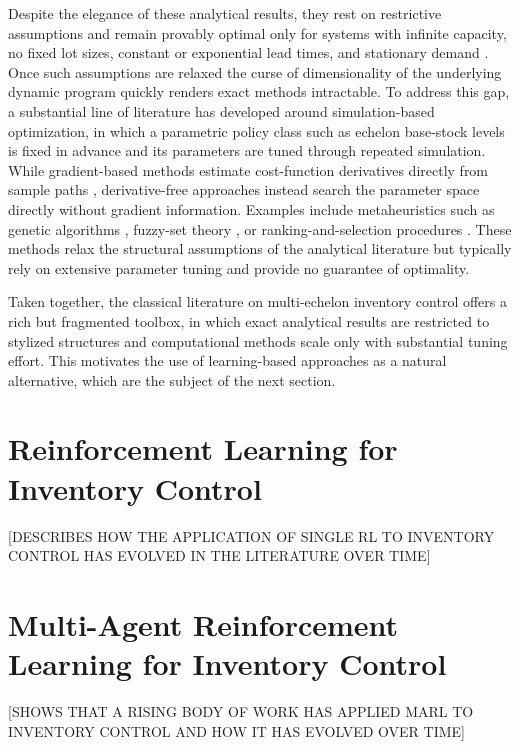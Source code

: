 Despite the elegance of these analytical results, they rest on restrictive assumptions and remain provably optimal only for systems with infinite capacity, no fixed lot sizes, constant or exponential lead times, and stationary demand \citep{dekok2018multiechelon}. Once such assumptions are relaxed the curse of dimensionality of the underlying dynamic program quickly renders exact methods intractable. To address this gap, a substantial line of literature has developed around simulation-based optimization, in which a parametric policy class such as echelon base-stock levels is fixed in advance and its parameters are tuned through repeated simulation. While gradient-based methods estimate cost-function derivatives directly from sample paths \citep[e.g.,][]{glasserman1995multiechelon, woerner2018multiechelon}, derivative-free approaches instead search the parameter space directly without gradient information. Examples include metaheuristics such as genetic algorithms \citep{daniel2005multiechelon, daniel2006multiechelon, kimbrough2002multiechelon}, fuzzy-set theory \citep{petrovic1999multiechelon, giannoccaro2003multiechelon}, or ranking-and-selection procedures \citep{tsai2013multiechelon}. These methods relax the structural assumptions of the analytical literature but typically rely on extensive parameter tuning and provide no guarantee of optimality. 

Taken together, the classical literature on multi-echelon inventory control offers a rich but fragmented toolbox, in which exact analytical results are restricted to stylized structures and computational methods scale only with substantial tuning effort. This motivates the use of learning-based approaches as a natural alternative, which are the subject of the next section.\\


\section{Reinforcement Learning for Inventory Control}
\label{sec:rl-inventory-control}
[DESCRIBES HOW THE APPLICATION OF SINGLE RL TO INVENTORY CONTROL HAS EVOLVED IN THE LITERATURE OVER TIME]


\section{Multi-Agent Reinforcement Learning for Inventory Control}
\label{sec:marl-inventory-control}

[SHOWS THAT A RISING BODY OF WORK HAS APPLIED MARL TO INVENTORY CONTROL AND HOW IT HAS EVOLVED OVER TIME]


